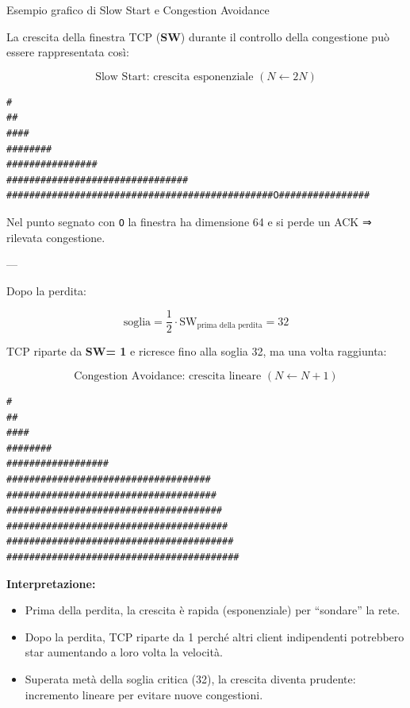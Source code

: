 \documentclass[a4paper,12pt]{report}
\begin{document}
\newpage
\begin{esempiobox}{Esempio grafico di Slow Start e Congestion Avoidance}

La crescita della finestra TCP (\textbf{SW}) durante il controllo della congestione può essere rappresentata così:

\[
\text{Slow Start: crescita esponenziale } (N \leftarrow 2N)
\]

\begin{verbatim}
#
##
####
########
################
################################
###############################################O################
\end{verbatim}

Nel punto segnato con \texttt{O} la finestra ha dimensione 64 e si perde un ACK  
⇒ rilevata congestione.

---

Dopo la perdita:

\[
\text{soglia} = \frac{1}{2} \cdot \text{SW}_{\text{prima della perdita}} = 32
\]

TCP riparte da \textbf{SW= 1} e ricresce fino alla soglia 32, ma una volta raggiunta:

\[
\text{Congestion Avoidance: crescita lineare } (N \leftarrow N+1)
\]

\begin{verbatim}
#
##
####
########
##################
####################################
#####################################
######################################
#######################################
########################################
#########################################
\end{verbatim}

\textbf{Interpretazione:}

\begin{itemize}
    \item Prima della perdita, la crescita è rapida (esponenziale) per “sondare” la rete.
    \item Dopo la perdita, TCP riparte da 1 perché altri client indipendenti potrebbero
          star aumentando a loro volta la velocità.
    \item Superata metà della soglia critica (32), la crescita diventa prudente:
          incremento lineare per evitare nuove congestioni.
\end{itemize}

\end{esempiobox}

\end{document}
